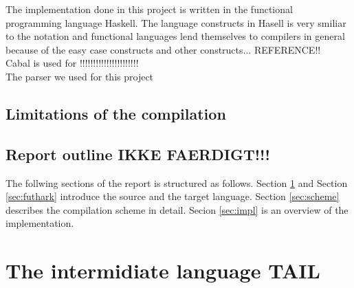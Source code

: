 \documentclass[11pt]{article}
\begin{document}
The implementation done in this project is written in the functional programming language Haskell. The language constructs in Hasell is very smiliar to the notation and functional languages lend themselves to compilers in general because of the easy case constructs and other constructs... REFERENCE!! \\%

Cabal is used for !!!!!!!!!!!!!!!!!!!!!!\\

The parser we used for this project 


\subsection{Limitations of the compilation}
% 

\subsection{Report outline IKKE FAERDIGT!!!}
The follwing sections of the report is structured as follows. Section \ref{sec:tail} and Section \ref{sec:futhark} introduce the source and the target language. Section \ref{sec:scheme} describes the compilation scheme in detail. Secion \ref{sec:impl} is an overview of the implementation.







\section{The intermidiate language TAIL}
\label{sec:tail}
\end{document}
